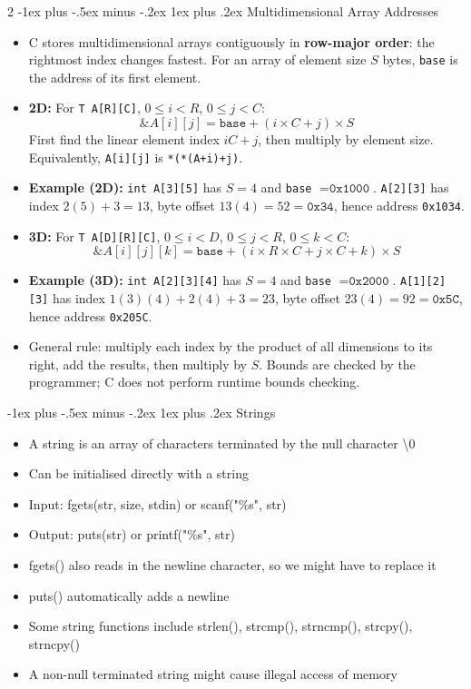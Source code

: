 \documentclass[10pt, portrait]{article}
\makeatletter
\renewcommand{\subsection}{\@startsection{subsection}{3}{0mm}%
                                {-1ex plus -.5ex minus -.2ex}%
                                {1ex plus .2ex}%
                                {\normalfont\small\bfseries}}%
\makeatother
\begin{document}
\begin{multicols*}{2}
\subsection{Multidimensional Array Addresses}
\begin{itemize}
    \item C stores multidimensional arrays contiguously in \textbf{row-major order}: the rightmost index changes fastest. For an array of element size $S$ bytes, \texttt{base} is the address of its first element.
    \item \textbf{2D:} For \texttt{T A[R][C]}, $0 \leq i < R$, $0 \leq j < C$:
    \[
        \&A[i][j] = \texttt{base} + (i \times C + j) \times S
    \]
    First find the linear element index $iC+j$, then multiply by element size. Equivalently, \texttt{A[i][j]} is \texttt{*(*(A+i)+j)}.
    \item \textbf{Example (2D):} \texttt{int A[3][5]} has $S=4$ and \texttt{base} $=\texttt{0x1000}$. \texttt{A[2][3]} has index $2(5)+3=13$, byte offset $13(4)=52=\texttt{0x34}$, hence address \texttt{0x1034}.
    \item \textbf{3D:} For \texttt{T A[D][R][C]}, $0 \leq i < D$, $0 \leq j < R$, $0 \leq k < C$:
    \[
        \&A[i][j][k] = \texttt{base} + (i \times R \times C + j \times C + k) \times S
    \]
    \item \textbf{Example (3D):} \texttt{int A[2][3][4]} has $S=4$ and \texttt{base} $=\texttt{0x2000}$. \texttt{A[1][2][3]} has index $1(3)(4)+2(4)+3=23$, byte offset $23(4)=92=\texttt{0x5C}$, hence address \texttt{0x205C}.
    \item General rule: multiply each index by the product of all dimensions to its right, add the results, then multiply by $S$. Bounds are checked by the programmer; C does not perform runtime bounds checking.
\end{itemize}

\subsection{Strings}
\begin{itemize}
    \item A string is an array of characters terminated by the null character \textbackslash 0
    \item Can be initialised directly with a string
    \item Input: fgets(str, size, stdin) or scanf("\%s", str)
    \item Output: puts(str) or printf("\%s", str)
    \item fgets() also reads in the newline character, so we might have to replace it
    \item puts() automatically adds a newline
    \item Some string functions include strlen(), strcmp(), strncmp(), strcpy(), strncpy()
    \item A non-null terminated string might cause illegal access of memory
\end{itemize}


\end{multicols*}
\end{document}
